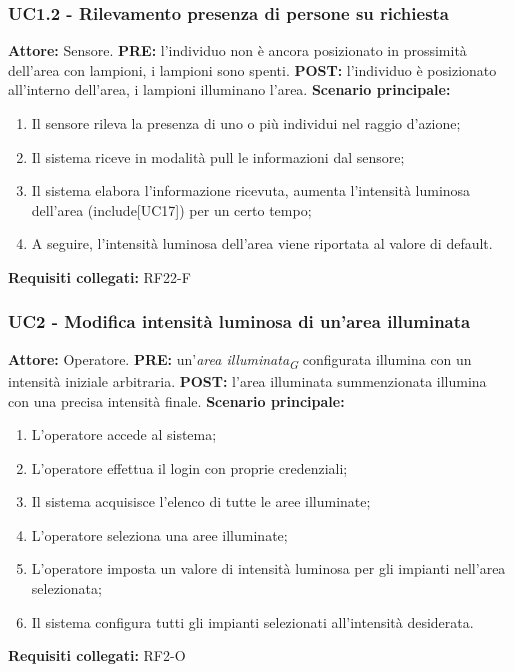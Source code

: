 \documentclass[a4paper, 12pt]{article}
\begin{document}
\subsubsection{UC1.2 - Rilevamento presenza di persone su richiesta}
\textbf{Attore:} Sensore.\newline
\textbf{PRE:} l'individuo non è ancora posizionato in prossimità dell'area con lampioni, i lampioni sono spenti.\newline
\textbf{POST:} l'individuo è posizionato all'interno dell'area, i lampioni illuminano l'area.\newline
\textbf{Scenario principale:}
\begin{enumerate}
    \item Il sensore rileva la presenza di uno o più individui nel raggio d'azione;
    \item Il sistema riceve in modalità pull le informazioni dal sensore;
    \item Il sistema elabora l'informazione ricevuta, aumenta l'intensità luminosa dell'area (include[UC17]) per un certo tempo;
    \item A seguire, l'intensità luminosa dell'area viene riportata al valore di default.
\end{enumerate}
\textbf{Requisiti collegati:} RF22-F\newline

\subsubsection{UC2 - Modifica intensità luminosa di un'area illuminata}
\textbf{Attore:} Operatore.\newline
\textbf{PRE:} un'\textit{area illuminata\textsubscript{G}} configurata illumina con un intensità iniziale arbitraria.\newline
\textbf{POST:} l'area illuminata summenzionata illumina con una precisa intensità finale.\newline
\textbf{Scenario principale:}
\begin{enumerate}
    \item L'operatore accede al sistema;
    \item L'operatore effettua il login con proprie credenziali;
    \item Il sistema acquisisce l'elenco di tutte le aree illuminate;
    \item L'operatore seleziona una aree illuminate;
    \item L'operatore imposta un valore di intensità luminosa per gli impianti nell'area selezionata;
    \item Il sistema configura tutti gli impianti selezionati all'intensità desiderata.
\end{enumerate}
\textbf{Requisiti collegati:} RF2-O\newline
\end{document}
